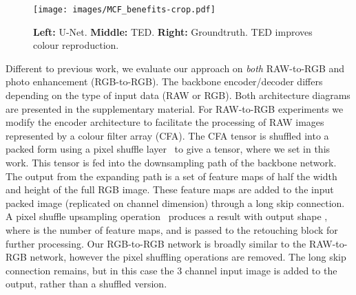 \documentclass[a4paper,conference]{IEEEtran}
\begin{document}
\begin{table}[t]
\centering
\caption{Backbone network (TED) with MSCA-skip connection, improves image quality with fewer parameters (Samsung S7 dataset).}
\label{tab:resultsMCSA2}
\end{table}

\begin{figure}[t!]
\begin{center}
\texttt{[image: images/MCF\_benefits-crop.pdf]}
\end{center}
\caption{\textbf{Left:} U-Net. \textbf{Middle:} TED. \textbf{Right:} Groundtruth.  TED improves colour reproduction.}
\label{fig:color_bleeding}
\end{figure}

Different to previous work, we evaluate our approach on \emph{both} RAW-to-RGB and photo enhancement (RGB-to-RGB). The backbone encoder/decoder differs depending on the type of input data (RAW or RGB). Both architecture diagrams are presented in the supplementary material. For RAW-to-RGB experiments we modify the encoder architecture to facilitate the processing of RAW images represented by a colour filter array (CFA). The CFA tensor  is shuffled into a packed form using a pixel shuffle layer~\cite{Ledig17} to give a  tensor, where we set  in this work. This tensor is fed into the downsampling path of the backbone network. The output from the expanding path is a set of feature maps of half the width and height of the full RGB image. These feature maps are added to the input packed image (replicated  on channel dimension) through a long skip connection. A pixel shuffle upsampling operation~\cite{Ledig17} produces a result with output shape , where  is the number of feature maps, and is passed to the retouching block for further processing. Our RGB-to-RGB network is broadly similar to the RAW-to-RGB network, however the pixel shuffling operations are removed. The long skip connection remains, but in this case the 3 channel input image is added to the output, rather than a shuffled version. 
\end{document}
